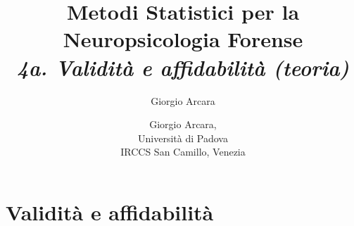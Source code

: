 \documentclass[
  ignorenonframetext,
]{beamer}
\author{Giorgio Arcara}
\date{}
\begin{document}
\begin{frame}
\title{Metodi Statistici per la Neuropsicologia Forense\\ \vspace{1em} \small \emph{4a. Validità e affidabilità (teoria)}}
\author{Giorgio Arcara,\\ Università di Padova \\ IRCCS San Camillo, Venezia}

\maketitle
\end{frame}

\section{Validità e affidabilità}\label{validituxe0-e-affidabilituxe0}
\end{document}
